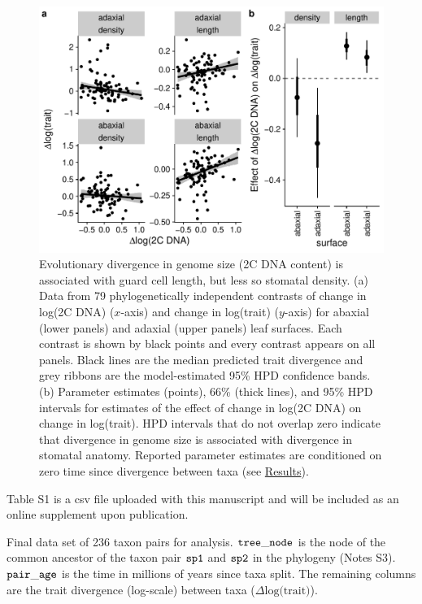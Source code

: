 \documentclass[
  12pt,
]{article}
\begin{document}
\begin{figure}[ht]
\includegraphics[width=\textwidth]{../figures/genome.pdf}
\caption{Evolutionary divergence in genome size (2C DNA content) is associated with guard cell length, but less so stomatal density. (a) Data from 79 phylogenetically independent contrasts of change in log(2C DNA) ($x$-axis) and change in log(trait) ($y$-axis) for abaxial (lower panels) and adaxial (upper panels) leaf surfaces. Each contrast is shown by black points and every contrast appears on all panels. Black lines are the median predicted trait divergence and grey ribbons are the model-estimated 95\% HPD confidence bands. (b) Parameter estimates (points), 66\% (thick lines), and 95\% HPD intervals for estimates of the effect of change in log(2C DNA) on change in log(trait). HPD intervals that do not overlap zero indicate that divergence in genome size is associated with divergence in stomatal anatomy. Reported parameter estimates are conditioned on zero time since divergence between taxa (see \protect\hyperlink{results}{Results}).}
  \label{fig:genome}
\end{figure}

\clearpage

\begin{center}
  Table S1 is a csv file uploaded with this manuscript and will be included as an online supplement upon publication.
\end{center}

\begin{table}
\caption{\label{tab:pair_div}Final data set of 236 taxon pairs for analysis. $\tt{tree\_node}$ is the node of the common ancestor of the taxon pair $\tt{sp1}$ and $\tt{sp2}$ in the phylogeny (Notes S3). $\tt{pair\_age}$ is the time in millions of years since taxa split. The remaining columns are the trait divergence (log-scale) between taxa ($\Delta \text{log(trait)}$).}
\end{table}
\end{document}
